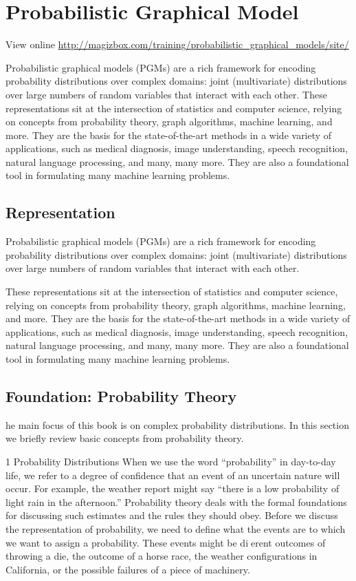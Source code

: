 \chapter{Probabilistic Graphical Model}

View online \href{http://magizbox.com/training/probabilistic_graphical_models/site/}{http://magizbox.com/training/probabilistic_graphical_models/site/}

Probabilistic graphical models (PGMs) are a rich framework for encoding probability distributions over complex domains: joint (multivariate) distributions over large numbers of random variables that interact with each other. These representations sit at the intersection of statistics and computer science, relying on concepts from probability theory, graph algorithms, machine learning, and more. They are the basis for the state-of-the-art methods in a wide variety of applications, such as medical diagnosis, image understanding, speech recognition, natural language processing, and many, many more. They are also a foundational tool in formulating many machine learning problems.

\section{Representation}

Probabilistic graphical models (PGMs) are a rich framework for encoding probability distributions over complex domains: joint (multivariate) distributions over large numbers of random variables that interact with each other.

These representations sit at the intersection of statistics and computer science, relying on concepts from probability theory, graph algorithms, machine learning, and more. They are the basis for the state-of-the-art methods in a wide variety of applications, such as medical diagnosis, image understanding, speech recognition, natural language processing, and many, many more. They are also a foundational tool in formulating many machine learning problems.

\section{Foundation: Probability Theory}

he main focus of this book is on complex probability distributions. In this section we briefly review basic concepts from probability theory.

1 Probability Distributions
When we use the word “probability” in day-to-day life, we refer to a degree of confidence that an event of an uncertain nature will occur. For example, the weather report might say “there is a low probability of light rain in the afternoon.” Probability theory deals with the formal foundations for discussing such estimates and the rules they should obey. Before we discuss the representation of probability, we need to define what the events are to which we want to assign a probability. These events might be dierent outcomes of throwing a die, the outcome of a horse race, the weather configurations in California, or the possible failures of a piece of machinery.

